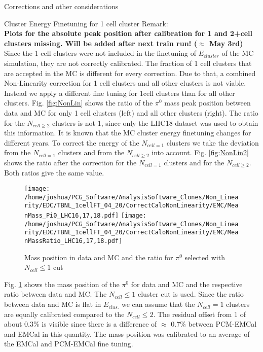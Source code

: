 \documentclass[ALICE]{ALICE_analysis_notes}
\newcommand{\PZ}{$\pi^0$\xspace}
\begin{document}
\begin{section}{Corrections and other considerations}
\begin{subsection}{Cluster Energy Finetuning for 1 cell cluster}
Remark:\\\textbf{Plots for the absolute peak position after calibration for 1 and 2+cell clusters missing. Will be added after next train run! ($\approx$ May 3rd)}\\
Since the 1 cell clusters were not included in the finetuning of $E_{cluster}$ of the MC simulation, they are not correctly calibrated. The fraction of 1 cell clusters that are accepted in the MC is different for every correction. Due to that, a combined Non-Linearity correction for 1 cell clusters and all other clusters is not viable. Instead we apply a different fine tuning for 1cell clusters than for all other clusters. Fig. \ref{fig:NonLin} shows the ratio of the $\pi^{0}$ mass peak position between data and MC for only 1 cell clusters (left) and all other clusters (right). The ratio for the $N_{cell \geq 2}$ clusters is not 1, since only the LHC18 dataset was used to obtain this information. It is known that the MC cluster energy finetuning changes for different years. To correct the energy of the $N_{cell = 1}$ clusters we take the deviation from the $N_{cell = 1}$ clusters and from the $N_{cell \geq 2}$ into account. Fig. \ref{fig:NonLin2} shows the ratio after the correction for the $N_{cell = 1}$ clusters and for the $N_{cell \geq 2}$. Both ratios give the same value. \\

\begin{figure}[ht!]
	\centering
	\texttt{[image: /home/joshua/PCG\_Software/AnalysisSoftware\_Clones/Non\_Linearity/EDC/TBNL\_1cellFT\_04\_20/CorrectCaloNonLinearity/EMC/MeanMass\_Pi0\_LHC16,17,18.pdf]}
	\texttt{[image: /home/joshua/PCG\_Software/AnalysisSoftware\_Clones/Non\_Linearity/EDC/TBNL\_1cellFT\_04\_20/CorrectCaloNonLinearity/EMC/MeanMassRatio\_LHC16,17,18.pdf]}
	\caption{ Mass position in data and MC and the ratio for \PZ selected with $N_{cell} \leq 1$ cut}
	\label{fig:NonLin3}
\end{figure}

Fig. \ref{fig:NonLin3} shows the mass position of the \PZ for data and MC and the respective ratio between data and MC. The $N_{cell} \leq 1$ cluster cut is used. Since the ratio between data and MC is flat in $E_{clus.}$ we can assume that the $N_{cell} = 1$ clusters are equally calibrated compared to the $N_{cell} \leq 2$. The residual offset from 1 of about 0.3\% is visible since there is a difference of $\approx$ 0.7\% between PCM-EMCal and EMCal in this quantity. The mass position was calibrated to an average of the EMCal and PCM-EMCal fine tuning.
\end{subsection}


\end{section}
\end{document}
